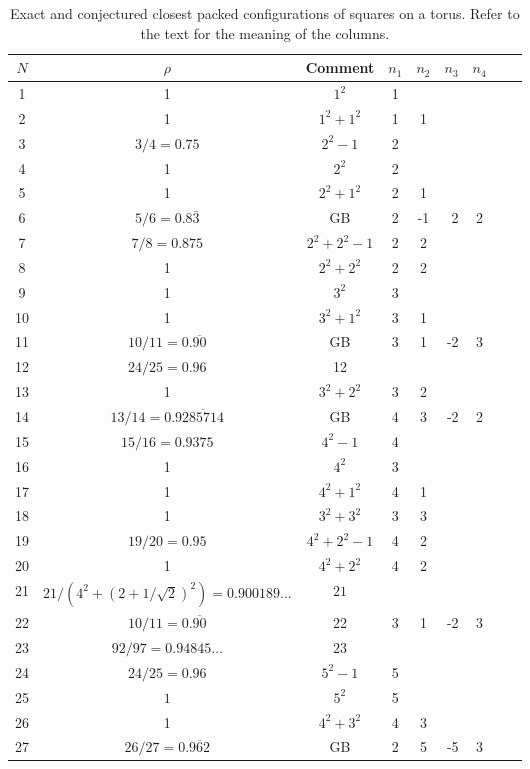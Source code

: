 \vspace{.3in}
\begin{table}
\label{table}
\caption{Exact and conjectured closest packed configurations of squares on a torus.  Refer to the text for the meaning of the columns.}
  \begin{tabular}{|c | c|c | c| c | r | c | c | c |}
\hline
  $N$ &$\rho$&Comment& $n_1$ & $n_2$ & $n_3$ & $n_4$  \\ \hline \hline
   1 &1&  $1^2$ & 1&  &   &    \\ \hline 
   2 &1&  $1^2+1^2$ &1& 1 &  &  \\ \hline
   3 &$3/4=0.75$&  $2^2 -1$ &2&  & &   \\ \hline
   4 &1&  $2^2$ &2& & &   \\ \hline
   5 &1&  $2^2+1^2$ &2& 1 &    & \\ \hline
   6 &$5/6=0.8\bar{3}$& GB &2& -1 &2 & 2   \\ \hline
   7 &$7/8=0.875$& $2^2+2^2 -1$ &2& 2 & &     \\ \hline
   8 &1& $2^2+2^2 $ &2& 2 & &     \\ \hline
   9 &1&  $3^2$ &3& & &  \\ \hline
   10 &1&  $3^2+1^2$ &3& 1 &    & \\ \hline
   11 &$10/11=0.\overline{90}$& GB &3& 1 &-2 & 3   \\ \hline
   12 &$24/25=0.96$& 12 && & &    \\ \hline
   13 &1&  $3^2+2^2$ &3& 2 &    & \\ \hline
   14 &$13/14=0.9\overline{285714}$& GB &4& 3 &-2 & 2   \\ \hline
   15 &$15/16=0.9375$&  $4^2 -1$ &4&  & &   \\ \hline
   16 &1&  $4^2$ &3& & &   \\ \hline
   17 &1&  $4^2+1^2$ &4& 1 &    & \\ \hline
   18 &1&  $3^2+3^2$ &3& 3 &    & \\ \hline
   19 &$19/20=0.95$&  $4^2 +2^2 -1$ &4& 2 & &   \\ \hline
   20 &1&  $4^2+2^2$ &4& 2 &    & \\ \hline
   21 &$21/(4^2+(2+1/\sqrt{2})^2)=0.900189 \ldots$&  $21$ & &  &   &    \\ \hline 
   22 &$10/11=0.\overline{90}$& 22 &3& 1 &-2 & 3  \\ \hline
   23 &$92/97=0.94845 \ldots$&  $23$ & &  &   &    \\ \hline
   24 &$24/25=0.96$&  $5^2 -1$ &5&  & &   \\ \hline
   25 &$1$&  $5^2$ &5&  & &   \\ \hline
   26 &1&  $4^2+3^2$ &4& 3 &    & \\ \hline
   27 &$26/27=0.\overline{962}$& GB &2&5 &-5 & 3  \\ \hline

\hline
\end{tabular}
\end{table}





